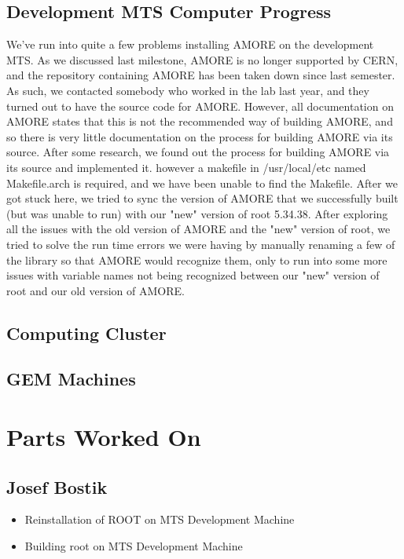 \documentclass[12pt]{article}
\newcommand\tab[1][1cm]{\hspace*{#1}}
\begin{document}
\subsection{Development MTS Computer Progress}
	We've run into quite a few problems installing AMORE on the development MTS.
	As we discussed last milestone, AMORE is no longer supported by CERN, and
	the repository containing AMORE has been taken down since last semester. As
	such, we contacted somebody who worked in the lab last year, and they turned
	out to have the source code for AMORE. However, all documentation on AMORE states
	that this is not the recommended way of building AMORE, and so there is very
	little documentation on the process for building AMORE via its source. After some
	research, we found out the process for building AMORE via its source and 
	implemented it. however a makefile in /usr/local/etc named Makefile.arch is 
	required, and we have been unable to find the Makefile. After we got 
	stuck here, we tried to sync the version of AMORE that we successfully built 
	(but was unable to run) with our "new" version of root 5.34.38. 
	After exploring all the issues with the old version of AMORE and the "new" 
	version of root, we tried to solve the run  time errors we were having 
	by manually renaming a few of the library so that AMORE
	would recognize them, only to run into some more issues with variable names 
	not being recognized between our "new" version of root and our old version
	of AMORE.
\tab 

\subsection{Computing Cluster}

\tab 

\subsection{GEM Machines}

\tab 
\section{Parts Worked On}

\subsection{Josef Bostik}

\begin{itemize}
\item Reinstallation of ROOT on MTS Development Machine
\item Building root on MTS Development Machine
\end{itemize}
\end{document}
